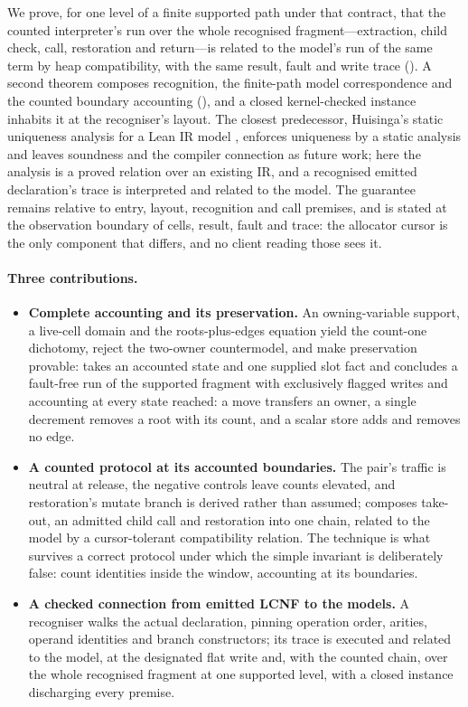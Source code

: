 \documentclass[a4paper,UKenglish,cleveref]{lipics-v2021}
\begin{document}
We prove, for one level of a finite supported path under that contract, that the
counted interpreter's run over the whole recognised fragment---extraction, child
check, call, restoration and return---is related to the model's run of the same
term by heap compatibility, with the same result, fault and write trace
(). A second theorem composes recognition, the
finite-path model correspondence and the counted boundary accounting
(), and a closed kernel-checked instance inhabits
it at the recogniser's layout. The closest predecessor, Huisinga's static
uniqueness analysis for a Lean IR model \cite{huisinga}, enforces uniqueness by a
static analysis and leaves soundness and the compiler connection as future work;
here the analysis is a proved relation over an existing IR, and a recognised
emitted declaration's trace is interpreted and related to the model. The guarantee remains relative to entry, layout,
recognition and call premises, and is stated at the observation boundary of cells,
result, fault and trace: the allocator cursor is the only component that differs,
and no client reading those sees it.

\paragraph*{Three contributions.}
\begin{itemize}
\item \textbf{Complete accounting and its preservation.} An owning-variable support,
a live-cell domain and the roots-plus-edges equation yield the count-one
dichotomy, reject the two-owner countermodel, and make preservation provable:
 takes an accounted state and one supplied slot fact and
concludes a fault-free run of the supported fragment with exclusively flagged
writes and accounting at every state reached: a move transfers an owner, a single
decrement removes a root with its count, and a scalar store adds and removes no
edge.
\item \textbf{A counted protocol at its accounted boundaries.} The pair's traffic
is neutral at release, the negative controls leave counts elevated, and
restoration's mutate branch is derived rather than assumed; 
composes take-out, an admitted child call and restoration into one chain, related
to the model by a cursor-tolerant compatibility relation. The technique is what
survives a correct protocol under which the simple invariant is deliberately
false: count identities inside the window, accounting at its boundaries.
\item \textbf{A checked connection from emitted LCNF to the models.} A recogniser
walks the actual declaration, pinning operation order, arities, operand identities
and branch constructors; its trace is executed and related to the model, at the
designated flat write and, with the counted chain, over the whole recognised
fragment at one supported level, with a closed instance discharging every premise.
\end{itemize}
\end{document}
